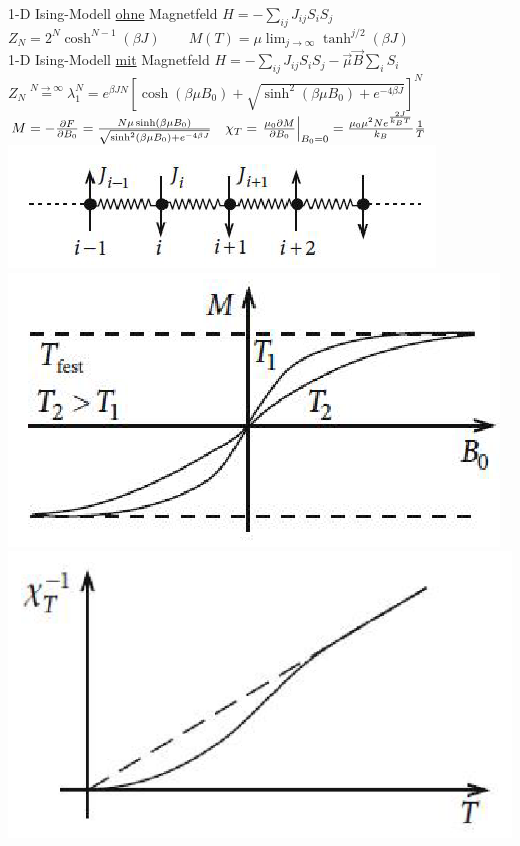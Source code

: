 




{\Huge
1-D Ising-Modell \underline{ohne} Magnetfeld \( \boxed{ H = -\sum_{ij}J_{ij}S_iS_j }  \)\\
  \(
    Z_N =  2^{N}\cosh^{N-1}( \beta J )\qquad M(T) = \mu \lim_{j\to\infty} \tanh^{j/2}(\beta J) 
  \)\\
1-D Ising-Modell \underline{mit} Magnetfeld \( \boxed{ H = -\sum_{ij}J_{ij}S_iS_j - \vec \mu \vec B \sum_i S_i} \)\\
\(
  Z_N \stackrel{N\to\infty} = \lambda_1^N = e^{\beta J N}\left[\cosh(\beta \mu B_0)+ \sqrt{\sinh^2(\beta \mu B_0) + e^{-4\beta J}   } \right]^N
\)\\
\(
  M =- \pdiff F_{B_0}= \frac{ N \mu \sinh(\beta \mu B_0)}{\sqrt{\sinh^2(\beta \mu B_0) + e^{-4\beta J}   }} \quad
  \chi_T = \left. \frac{\mu_0\partial M}{\partial B_0}\right|_{B_0=0} = \frac{ \mu_0 \mu^2 N e^{ \frac{2J}{k_B T}} }{k_B}\frac{1}{T}
\)
{
\centering
\includegraphics[scale=0.6]{../stat/ising-pics/ising01.png}
\includegraphics[scale=0.3]{../stat/ising-pics/ising02.png}
\includegraphics[scale=0.3]{../stat/ising-pics/ising03.png}
}

}%

